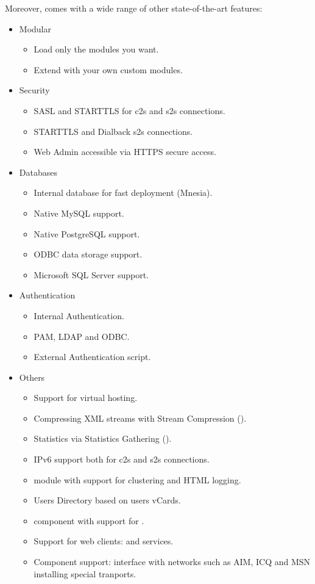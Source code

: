 Moreover, \ejabberd{} comes with a wide range of other state-of-the-art features:
\begin{itemize}
\item Modular
\begin{itemize}
\item Load only the modules you want.
\item Extend \ejabberd{} with your own custom modules.
\end{itemize}
\item Security
\begin{itemize}
\item SASL and STARTTLS for c2s and s2s connections.
\item STARTTLS and Dialback s2s connections.
\item Web Admin accessible via HTTPS secure access.
\end{itemize}
\item Databases
\begin{itemize}
\item Internal database for fast deployment (Mnesia).
\item Native MySQL support.
\item Native PostgreSQL support.
\item ODBC data storage support.
\item Microsoft SQL Server support. %
\end{itemize}
\item Authentication
\begin{itemize}
\item Internal Authentication.
\item PAM, LDAP and ODBC.  %
\item External Authentication script.
\end{itemize}
\item Others
\begin{itemize}
\item Support for virtual hosting.
\item Compressing XML streams with Stream Compression ().
\item Statistics via Statistics Gathering ().
\item IPv6 support both for c2s and s2s connections.
\item {} module with support for clustering and HTML logging. %
\item Users Directory based on users vCards.
\item {} component with support for .
\item Support for web clients:  and  services.
\item Component support: interface with networks such as AIM, ICQ and MSN installing special tranports.
\end{itemize}
\end{itemize}
